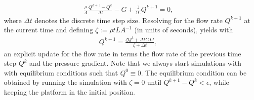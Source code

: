 \documentclass{article}
\begin{document}
\begin{align}
    \frac{\rho}{A} \frac{Q^{k+1} - Q^{k}}{\Delta t} - G + \frac{1}{tL} Q^{k+1} = 0,
\end{align}
where $\Delta t$ denotes the discrete time step size. Resolving for the flow rate $Q^{k+1}$ at the current time and defining $\zeta := \rho t L A^{-1}$ (in units of seconds), yields with
\begin{align}
    Q^{k+1} = \frac{\zeta Q^k + \Delta t GLt}{\zeta + \Delta t},
\end{align}
an explicit update for the flow rate in terms the flow rate of the previous time step $Q^k$ and the pressure gradient. Note that we always start simulations with with equilibrium conditions such that $Q^0 \equiv 0$. The equilibrium condition can be obtained by running the simulation with $\zeta = 0$ until $Q^{k+1} - Q^k < \epsilon$, while keeping the platform in the initial position.






\end{document}
